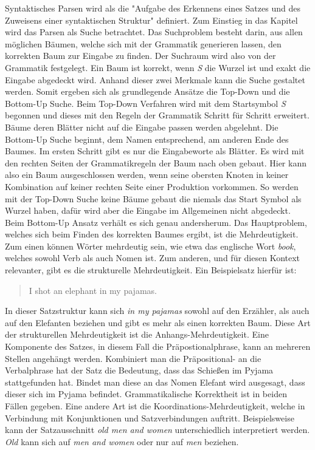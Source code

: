 Syntaktisches Parsen wird als die "Aufgabe des Erkennens eines Satzes und des Zuweisens einer syntaktischen Struktur" definiert. %
Zum Einstieg in das Kapitel wird das Parsen als Suche betrachtet. Das Suchproblem besteht darin, aus allen möglichen Bäumen, welche sich mit der Grammatik generieren lassen, den korrekten Baum zur Eingabe zu finden. Der Suchraum wird also von der Grammatik festgelegt. Ein Baum ist korrekt, wenn \textit{S} die Wurzel ist und exakt die Eingabe abgedeckt wird. Anhand dieser zwei Merkmale kann die Suche gestaltet werden. Somit ergeben sich als grundlegende Ansätze die Top-Down und die Bottom-Up Suche. Beim Top-Down Verfahren wird mit dem Startsymbol \textit{S} begonnen und dieses mit den Regeln der Grammatik Schritt für Schritt erweitert. Bäume deren Blätter nicht auf die Eingabe passen werden abgelehnt. Die Bottom-Up Suche beginnt, dem Namen entsprechend, am anderen Ende des Baumes. Im ersten Schritt gibt es nur die Eingabeworte als Blätter. Es wird mit den rechten Seiten der Grammatikregeln der Baum nach oben gebaut. Hier kann also ein Baum ausgeschlossen werden, wenn seine obersten Knoten in keiner Kombination auf keiner rechten Seite einer Produktion vorkommen. %
So werden mit der Top-Down Suche keine Bäume gebaut die niemals das Start Symbol als Wurzel haben, dafür wird aber die Eingabe im Allgemeinen nicht abgedeckt. Beim Bottom-Up Ansatz verhält es sich genau andersherum. 
Das Hauptproblem, welches sich beim Finden des korrekten Baumes ergibt, ist die Mehrdeutigkeit. Zum einen können Wörter mehrdeutig sein, wie etwa das englische Wort \textit{book}, welches sowohl Verb als auch Nomen ist. Zum anderen, und für diesen Kontext relevanter, gibt es die strukturelle Mehrdeutigkeit. Ein Beispielsatz hierfür ist: 
\begin{quote}
I shot an elephant in my pajamas.
\end{quote}
In dieser Satzstruktur kann sich \textit{in my pajamas} sowohl auf den Erzähler, als auch auf den Elefanten beziehen und gibt es mehr als einen korrekten Baum. %
Diese Art der strukturellen Mehrdeutigkeit ist die Anhangs-Mehrdeutigkeit. Eine Komponente des Satzes, in diesem Fall die Präpostionalphrase, kann an mehreren Stellen angehängt werden. Kombiniert man die Präpositional- an die Verbalphrase hat der Satz die Bedeutung, dass das Schießen im Pyjama stattgefunden hat. Bindet man diese an das Nomen Elefant wird ausgesagt, dass dieser sich im Pyjama befindet. Grammatikalische Korrektheit ist in beiden Fällen gegeben. Eine andere Art ist die Koordinations-Mehrdeutigkeit, welche in Verbindung mit Konjunktionen und Satzverbindungen auftritt. Beispielsweise kann der Satzausschnitt \textit{old men and women} unterschiedlich interpretiert werden. \textit{Old} kann sich auf \textit{men and women} oder nur auf \textit{men} beziehen. \\
